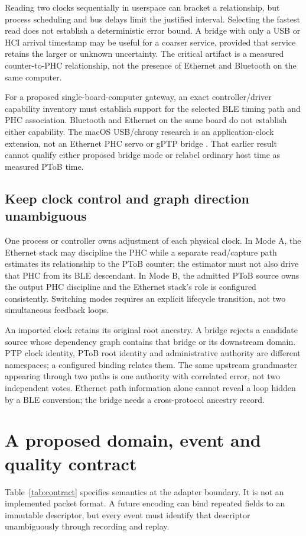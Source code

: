 \documentclass[11pt,letterpaper]{article}
\begin{document}
Reading two clocks sequentially in userspace can bracket a relationship, but process scheduling and bus delays limit the justified interval. Selecting the fastest read does not establish a deterministic error bound. A bridge with only a USB or HCI arrival timestamp may be useful for a coarser service, provided that service retains the larger or unknown uncertainty. The critical artifact is a measured counter-to-PHC relationship, not the presence of Ethernet and Bluetooth on the same computer.

For a proposed single-board-computer gateway, an exact controller/driver capability inventory must establish support for the selected BLE timing path and PHC association. Bluetooth and Ethernet on the same board do not establish either capability. The macOS USB/chrony research is an application-clock extension, not an Ethernet PHC servo or gPTP bridge \cite{usb}. That earlier result cannot qualify either proposed bridge mode or relabel ordinary host time as measured PToB time.

\subsection{Keep clock control and graph direction unambiguous}
One process or controller owns adjustment of each physical clock. In Mode A, the Ethernet stack may discipline the PHC while a separate read/capture path estimates its relationship to the PToB counter; the estimator must not also drive that PHC from its BLE descendant. In Mode B, the admitted PToB source owns the output PHC discipline and the Ethernet stack's role is configured consistently. Switching modes requires an explicit lifecycle transition, not two simultaneous feedback loops.

An imported clock retains its original root ancestry. A bridge rejects a candidate source whose dependency graph contains that bridge or its downstream domain. PTP clock identity, PToB root identity and administrative authority are different namespaces; a configured binding relates them. The same upstream grandmaster appearing through two paths is one authority with correlated error, not two independent votes. Ethernet path information alone cannot reveal a loop hidden by a BLE conversion; the bridge needs a cross-protocol ancestry record.

\section{A proposed domain, event and quality contract}
Table~\ref{tab:contract} specifies semantics at the adapter boundary. It is not an implemented packet format. A future encoding can bind repeated fields to an immutable descriptor, but every event must identify that descriptor unambiguously through recording and replay.
\end{document}
